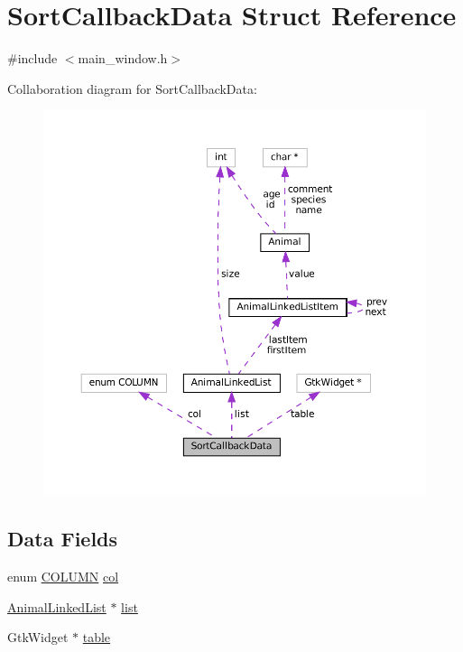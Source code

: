 \hypertarget{struct_sort_callback_data}{}\section{Sort\+Callback\+Data Struct Reference}
\label{struct_sort_callback_data}


{\ttfamily \#include $<$main\+\_\+window.\+h$>$}



Collaboration diagram for Sort\+Callback\+Data\+:
\nopagebreak
\begin{figure}[H]
\begin{center}
\leavevmode
\includegraphics[width=350pt]{struct_sort_callback_data__coll__graph}
\end{center}
\end{figure}
\subsection*{Data Fields}
\begin{DoxyCompactItemize}
\item 
enum \mbox{\hyperlink{main__window_8h_a727e9b9696032b380d0072840595ef05}{C\+O\+L\+U\+MN}} \mbox{\hyperlink{struct_sort_callback_data_a0e28c35278440f85596b96930dcf7025}{col}}
\item 
\mbox{\hyperlink{struct_animal_linked_list}{Animal\+Linked\+List}} $\ast$ \mbox{\hyperlink{struct_sort_callback_data_a7fb8d190af45cd79bcf2f1cf986d018b}{list}}
\item 
Gtk\+Widget $\ast$ \mbox{\hyperlink{struct_sort_callback_data_a156725d482db7655e8817dc15865d191}{table}}
\end{DoxyCompactItemize}


